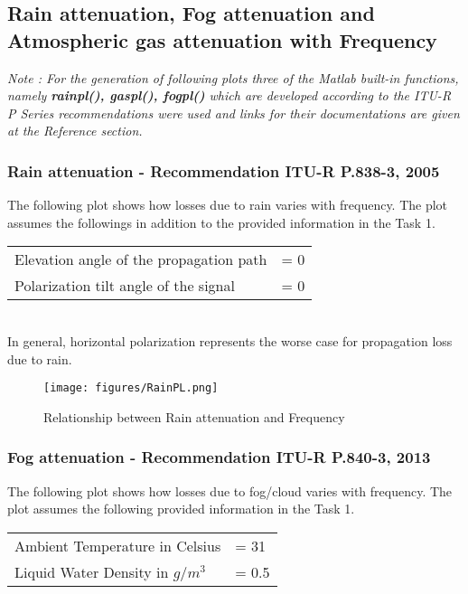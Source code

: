 \documentclass[a4paper,11pt]{article}%
\begin{document}
\pagebreak
\subsection{Rain attenuation, Fog attenuation and Atmospheric gas attenuation with Frequency}

\textit{Note : For the generation of following plots three of the Matlab built-in functions, namely \textbf{rainpl()\cite{matlab}, gaspl()\cite{matlab}, fogpl()\cite{matlab}} which are developed according to the ITU-R P Series recommendations were used and links for their documentations are given at the Reference section.}


\subsubsection{Rain attenuation - Recommendation ITU-R P.838-3, 2005\cite{rain}}
The following plot shows how losses due to rain varies with frequency. The plot assumes the followings in addition to the provided information in the Task 1.\\

\begin{tabular}{l l}
Elevation angle of the propagation path& = 0 \\
Polarization tilt angle of the signal &= 0\\
\end{tabular}\\

In general, horizontal polarization represents the worse case for propagation loss due to rain.

\begin{figure}[!h]
	\centering
	\texttt{[image: figures/RainPL.png]}
	\caption{Relationship between Rain attenuation and Frequency}
\end{figure}

\subsubsection{Fog attenuation - Recommendation ITU-R P.840-3, 2013\cite{fog}}
The following plot shows how losses due to fog/cloud varies with frequency. The plot assumes the following provided information in the Task 1.\\

\begin{tabular}{l l}
	Ambient Temperature in Celsius&= 31\\
	Liquid Water Density in $g/m^3$&= 0.5\\
\end{tabular}\\
\end{document}
